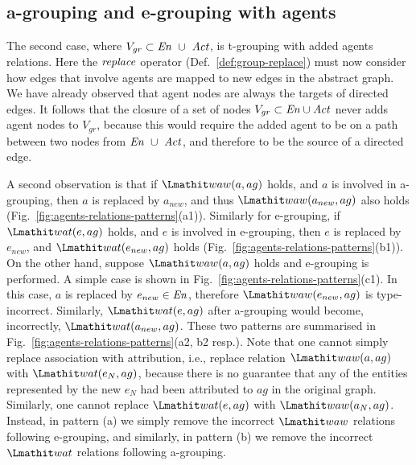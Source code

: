 \subsection{a-grouping and e-grouping with agents}  \label{sec:t-grouping-agents}

The second case, where $V_{gr} \subset \mathit{En} ~\cup~ \mathit{Act}$, is t-grouping with added agents relations.
%
Here the $\mathit{replace}$ operator (Def.~\ref{def:group-replace}) must now consider how edges that involve agents are mapped to new edges in the abstract graph. 
%
We have already observed that agent nodes are always the targets of directed edges.
%
It follows that the closure of a set of nodes $V_{gr} \subset \mathit{En} \cup \mathit{Act}$ never adds agent nodes to $V_{gr}$, because this would require the added agent to be on a path between two nodes from $\mathit{En} ~\cup~ \mathit{Act}$, and therefore to be the source of a directed edge. 
%

%
A second observation is that if $\waw(a, ag)$ holds, and $a$ is involved in a-grouping, then $a$ is replaced by $a_{new}$, and thus $\waw(a_{new}, ag)$ also holds (Fig.~\ref{fig:agents-relations-patterns}(a1)).
%
Similarly for e-grouping, if $\wat(e, ag)$ holds, and $e$ is involved in e-grouping, then $e$ is replaced by $e_{new}$, and $\wat(e_{new}, ag)$ holds  (Fig.~\ref{fig:agents-relations-patterns}(b1)).
%
On the other hand, suppose $\waw(a,ag)$ holds and e-grouping is performed. A simple case is shown in Fig.~\ref{fig:agents-relations-patterns}(c1).
%
In this case, $a$ is replaced by $e_{new} \in \mathit{En}$, therefore $\waw(e_{new},ag)$ is type-incorrect. Similarly, $\wat(e,ag)$ after a-grouping would become, incorrectly,  $\wat(a_{new}, ag)$.
%
These two patterns are summarised in Fig.~\ref{fig:agents-relations-patterns}(a2, b2 resp.). Note that one cannot simply replace association with attribution, i.e., replace relation $\waw(a, ag)$ with $\wat(e_N, ag)$, because there is no guarantee that any of the entities represented by the new $e_N$ had been attributed to $ag$ in the original graph. Similarly, one cannot replace $\wat(e, ag)$ with $\waw(a_N, ag)$.
%
Instead, in pattern (a) we simply remove the incorrect $\waw$ relations following e-grouping, and similarly, in pattern (b) we remove the incorrect $\wat$ relations following a-grouping.

